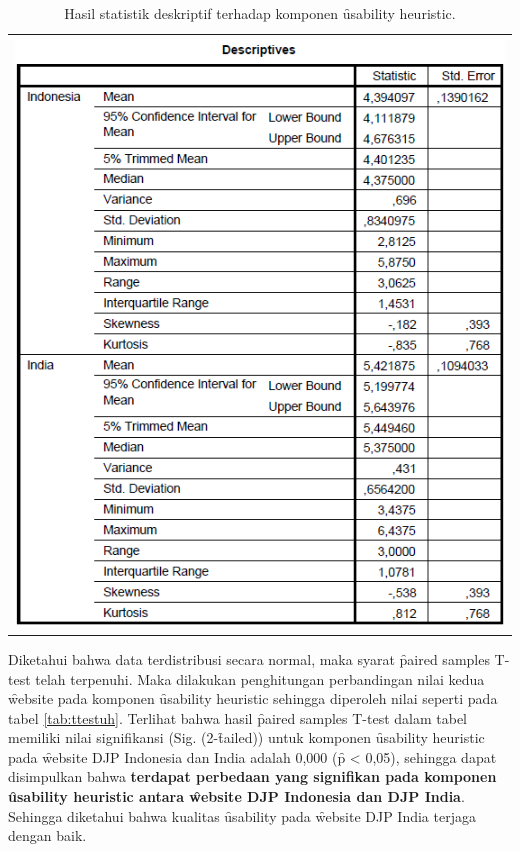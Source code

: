\begin{table}
	\centering
	\caption{Hasil statistik deskriptif terhadap komponen \f{usability heuristic}.}
	\label{tab:descuh}
	\begin{tabular}{c}
		\includegraphics[width=\textwidth]
		{pics/ordinalDescUH.PNG}
	\end{tabular}
\end{table}
\noindent
Diketahui bahwa data terdistribusi secara normal, maka syarat \f{paired samples T-test} telah terpenuhi. Maka dilakukan penghitungan perbandingan nilai kedua \f{website} pada komponen \f{usability heuristic} sehingga diperoleh nilai seperti pada tabel \ref{tab:ttestuh}. Terlihat bahwa hasil \f{paired samples T-test} dalam tabel memiliki nilai signifikansi (Sig. (2-\f{tailed})) untuk komponen \f{usability heuristic} pada \f{website} DJP Indonesia dan India adalah 0,000 (\f{p} < 0,05), sehingga dapat disimpulkan bahwa \textbf{terdapat perbedaan yang signifikan pada komponen \f{usability heuristic} antara \f{website} DJP Indonesia dan DJP India}. Sehingga diketahui bahwa kualitas \f{usability} pada \f{website} DJP India terjaga dengan baik.

